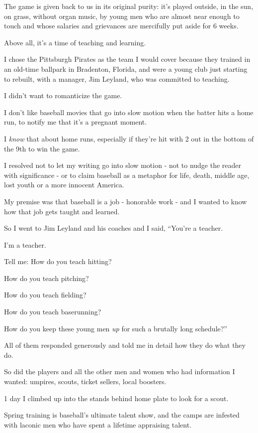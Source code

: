 \documentclass{book}
\numberwithin{equation}{section}
\begin{document}
The game is given back to us in its original purity: it's played outside, in the sun, on grass, without organ music, by young men who are almost near enough to touch and whose salaries and grievances are mercifully put aside for 6 weeks.

Above all, it's a time of teaching and learning.

I chose the Pittsburgh Pirates as the team I would cover because they trained in an old-time ballpark in Bradenton, Florida, and were a young club just starting to rebuilt, with a manager, Jim Leyland, who was committed to teaching.

%
I didn't want to romanticize the game.

I don't like baseball movies that go into slow motion when the batter hits a home run, to notify me that it's a pregnant moment.

I \textit{know} that about home runs, especially if they're hit with 2 out in the bottom of the 9th to win the game.

I resolved not to let my writing go into slow motion - not to nudge the reader with significance - or to claim baseball as a metaphor for life, death, middle age, lost youth or a more innocent America.

My premise was that baseball is a job - honorable work - and I wanted to know how that job gets taught and learned.

%
So I went to Jim Leyland and his coaches and I said, ``You're a teacher.

I'm a teacher.

Tell me: How do you teach hitting?

How do you teach pitching?

How do you teach fielding?

How do you teach baserunning?

How do you keep these young men \textit{up} for such a brutally long schedule?''

All of them responded generously and told me in detail how they do what they do.

So did the players and all the other men and women who had information I wanted: umpires, scouts, ticket sellers, local boosters.

%
1 day I climbed up into the stands behind home plate to look for a scout.

Spring training is baseball's ultimate talent show, and the camps are infested with laconic men who have spent a lifetime appraising talent.
\end{document}
